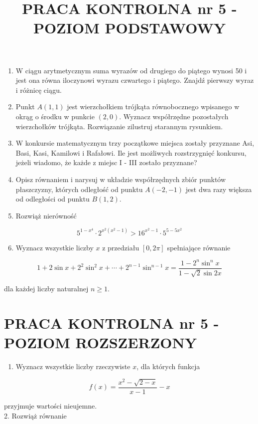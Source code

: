 \documentclass[10pt]{article}
\title{PRACA KONTROLNA nr 5 - POZIOM PODSTAWOWY }
\author{}
\date{}
\begin{document}
\maketitle
\begin{enumerate}
  \item W ciągu arytmetycznym suma wyrazów od drugiego do piątego wynosi 50 i jest ona równa iloczynowi wyrazu czwartego i piątego. Znajdź pierwszy wyraz i różnicę ciągu.
  \item Punkt $A(1,1)$ jest wierzchołkiem trójkąta równobocznego wpisanego w okrąg o środku w punkcie $(2,0)$. Wyznacz współrzędne pozostałych wierzchołków trójkąta. Rozwiązanie zilustruj starannym rysunkiem.
  \item W konkursie matematycznym trzy początkowe miejsca zostały przyznane Asi, Basi, Kasi, Kamilowi i Rafałowi. Ile jest możliwych rozstrzygnięć konkursu, jeżeli wiadomo, że każde z miejsc I - III zostało przyznane?
  \item Opisz równaniem i narysuj w układzie współrzędnych zbiór punktów płaszczyzny, których odległość od punktu $A(-2,-1)$ jest dwa razy większa od odległości od punktu $B(1,2)$.
  \item Rozwiąż nierówność
\end{enumerate}

$$
5^{1-x^{4}} \cdot 2^{x^{2}\left(x^{2}-1\right)}>16^{x^{2}-1} \cdot 5^{5-5 x^{2}}
$$

\begin{enumerate}
  \setcounter{enumi}{5}
  \item Wyznacz wszystkie liczby $x$ z przedziału $[0,2 \pi]$ spełniające równanie
\end{enumerate}

$$
1+2 \sin x+2^{2} \sin ^{2} x+\cdots+2^{n-1} \sin ^{n-1} x=\frac{1-2^{n} \sin ^{n} x}{1-\sqrt{2} \sin 2 x}
$$

dla każdej liczby naturalnej $n \geqslant 1$.

\section*{PRACA KONTROLNA nr 5 - POZIOM ROZSZERZONY}
\begin{enumerate}
  \item Wyznacz wszystkie liczby rzeczywiste $x$, dla których funkcja
\end{enumerate}

$$
f(x)=\frac{x^{2}-\sqrt{2-x}}{x-1}-x
$$

przyjmuje wartości nieujemne.\\
2. Rozwiąż równanie
\end{document}
